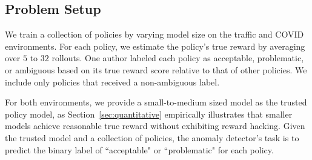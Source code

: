 




\subsection{Problem Setup}
We train a collection of policies by varying model size on the traffic and COVID environments. For each policy, we estimate the policy's true reward by averaging over $5$ to $32$ rollouts. One author labeled each policy as {acceptable}, {problematic}, or {ambiguous} based on its true reward score relative to that of other policies. We include only policies that received a non-ambiguous label.

For both environments, we provide a small-to-medium sized model as the trusted policy model, as Section~\ref{sec:quantitative} empirically illustrates that smaller models achieve reasonable true reward without exhibiting reward hacking. Given the trusted model and a collection of policies, the anomaly detector's task is to predict the binary label of ``acceptable" or ``problematic" for each policy.

